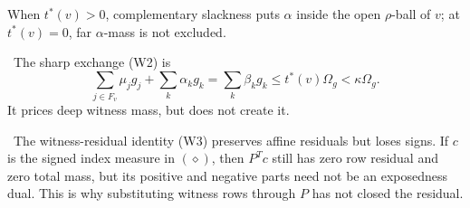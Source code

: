 When \(t^*(v)>0\), complementary slackness puts \(\alpha\) inside the open \(\rho\)-ball of
\(v\); at \(t^*(v)=0\), far \(\alpha\)-mass is not excluded.
\begin{proposition}
\provedbadge\ The sharp exchange (W2) is
\[
  \sum_{j\in F_v}\mu_jg_j+\sum_k\alpha_kg_k=\sum_k\beta_kg_k
  \le t^*(v)\Omega_g<\kappa\Omega_g .
\]
It prices deep witness mass, but does not create it.
\end{proposition}
\begin{warning}
\provedbadge\ The witness-residual identity (W3) preserves affine residuals but loses signs.
If \(c\) is the signed index measure in \((\diamond)\), then \(P^Tc\) still has zero row
residual and zero total mass, but
its positive and negative parts need not be an exposedness dual.  This is why substituting
witness rows through \(P\) has not closed the residual.
\end{warning}

